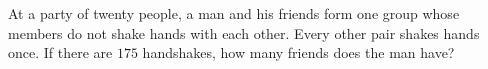 At a party of twenty people, a man and his friends form one group whose members do not shake hands with each other. Every other pair shakes hands once. If there are $175$ handshakes, how many friends does the man have?
